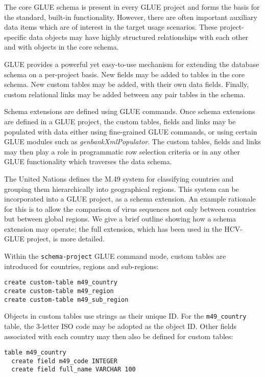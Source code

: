 
The core GLUE schema is present in every GLUE project and forms the basis for
the standard, built-in functionality. However, there are often important
auxiliary data items which are of interest in the target usage scenarios. These
project-specific data objects may have highly structured relationships with each
other and with objects in the core schema.

GLUE provides a powerful yet easy-to-use mechanism for extending the database
schema on a per-project basis. New fields may be added to tables in the core
schema. New custom tables may be added, with their own data fields.
Finally, custom relational links may be added between any pair tables in the
schema.

Schema extensions are defined using GLUE commands. Once schema extensions are
defined in a GLUE project, the custom tables, fields and links may be populated
with data either using fine-grained GLUE commands, or using certain GLUE modules
such as \emph{genbankXmlPopulator}. The custom tables, fields and links may then play
a role in programmatic row selection criteria or in any other GLUE functionality
which traverses the data schema.


The United Nations defines the M.49 system \cite{M49_1996} for classifying
countries and grouping them hierarchically into geographical regions. This
system can be incorporated into a GLUE project, as a schema extension. An
example rationale for this is to allow the comparison of virus sequences not
only between countries but between global regions. We give a brief outline
showing how a schema extension may operate; the full extension, which has been
used in the HCV-GLUE project, is more detailed.

Within the \texttt{schema-project} GLUE command mode, custom tables are
introduced for countries, regions and sub-regions:
\begin{verbatim}
create custom-table m49_country
create custom-table m49_region
create custom-table m49_sub_region
\end{verbatim}

Objects in custom tables use strings as their unique ID. For the
\texttt{m49\_country} table, the 3-letter ISO code may be adopted as the object
ID. Other fields associated with each country may then also be defined for
custom tables:

\begin{verbatim}
table m49_country
  create field m49_code INTEGER
  create field full_name VARCHAR 100
\end{verbatim}

